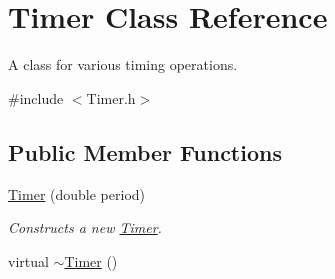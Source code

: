 \hypertarget{class_timer}{\section{Timer Class Reference}
\label{class_timer}
}


A class for various timing operations.  




{\ttfamily \#include $<$Timer.\+h$>$}

\subsection*{Public Member Functions}
\begin{DoxyCompactItemize}
\item 
\hyperlink{class_timer_aa9efcdd947c18f71b15205162483c79c}{Timer} (double period)
\begin{DoxyCompactList}\small\item\em Constructs a new \hyperlink{class_timer}{Timer}. \end{DoxyCompactList}\item 
\hypertarget{class_timer_a14fa469c4c295c5fa6e66a4ad1092146}{virtual \hyperlink{class_timer_a14fa469c4c295c5fa6e66a4ad1092146}{$\sim$\+Timer} ()}\label{class_timer_a14fa469c4c295c5fa6e66a4ad1092146}


\end{DoxyCompactItemize}
